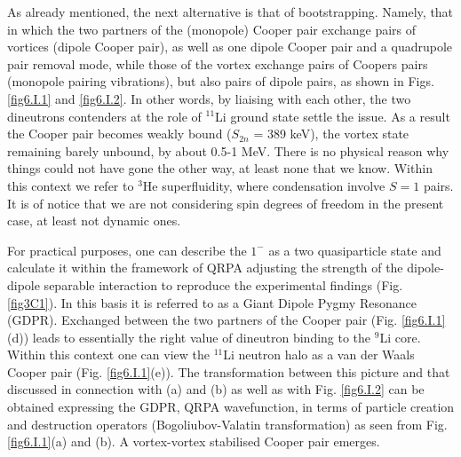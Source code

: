 \begin{subappendices}
As already mentioned, the next alternative is that of bootstrapping. Namely, that in which the two partners of the  (monopole) Cooper pair exchange  pairs of vortices 
(dipole Cooper pair),  as well as one dipole Cooper pair and a quadrupole pair removal mode,
while those of the vortex exchange  pairs of Coopers pairs (monopole pairing vibrations), but also pairs of dipole pairs, as shown in Figs. \ref{fig6.I.1} and \ref{fig6.I.2}.  In other words, by  liaising  with each other,  
the two dineutrons contenders at the role of $^{11}$Li ground state  settle the issue.  As a result  the Cooper pair becomes weakly bound ($S_{2n}$ = 389 keV), the vortex state remaining barely unbound, by about 0.5-1 MeV.
There is no physical reason why things could not have gone  the other way, at least none that we know. Within this context we refer to $^3$He superfluidity, where condensation involve $S=1$ pairs. It is of notice that we are not considering spin degrees of freedom in  the present case,
at least  not dynamic ones. 

For practical purposes, one can describe the  $1^-$ as a two quasiparticle state and calculate it within  the framework of QRPA adjusting the strength of the dipole-dipole separable interaction to reproduce the  experimental findings (Fig. \ref{fig3C1}). In this basis it is referred to  as a Giant Dipole Pygmy Resonance (GDPR). Exchanged between the  two partners of the Cooper pair (Fig. \ref{fig6.I.1}(d)) leads to essentially the right value of  dineutron binding  to the $^9$Li core. Within this context  one can view the
$^{11}$Li neutron halo as a van der Waals Cooper pair (Fig. \ref{fig6.I.1}(e)). The transformation between this picture and  that discussed in connection with 
(a) and (b) as well as with Fig. \ref{fig6.I.2} can be obtained  expressing the GDPR, QRPA wavefunction, in terms of particle  creation and destruction operators (Bogoliubov-Valatin transformation) as seen from Fig. \ref{fig6.I.1}(a) and (b). 
A vortex-vortex  stabilised Cooper pair emerges. 


\end{subappendices}
